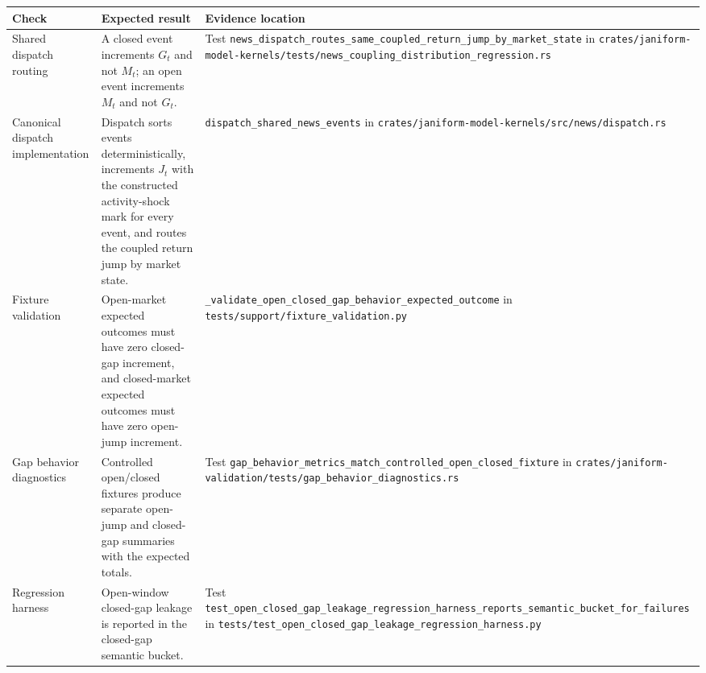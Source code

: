 \documentclass[11pt]{article}
\begin{document}
\begin{tabularx}{\textwidth}{XXX}
\toprule
Check & Expected result & Evidence location\\
\midrule
Shared dispatch routing
& A closed event increments \(G_t\) and not \(M_t\); an open event increments \(M_t\) and not \(G_t\).
& Test \texttt{news\_dispatch\_routes\_same\_coupled\_return\_jump\_by\_market\_state} in \texttt{crates/janiform-model-kernels/tests/news\_coupling\_distribution\_regression.rs}\\
Canonical dispatch implementation
& Dispatch sorts events deterministically, increments \(J_t\) with the constructed activity-shock mark for every event, and routes the coupled return jump by market state.
& \texttt{dispatch\_shared\_news\_events} in \texttt{crates/janiform-model-kernels/src/news/dispatch.rs}\\
Fixture validation
& Open-market expected outcomes must have zero closed-gap increment, and closed-market expected outcomes must have zero open-jump increment.
& \texttt{\_validate\_open\_closed\_gap\_behavior\_expected\_outcome} in \texttt{tests/support/fixture\_validation.py}\\
Gap behavior diagnostics
& Controlled open/closed fixtures produce separate open-jump and closed-gap summaries with the expected totals.
& Test \texttt{gap\_behavior\_metrics\_match\_controlled\_open\_closed\_fixture} in \texttt{crates/janiform-validation/tests/gap\_behavior\_diagnostics.rs}\\
Regression harness
& Open-window closed-gap leakage is reported in the closed-gap semantic bucket.
& Test \texttt{test\_open\_closed\_gap\_leakage\_regression\_harness\_reports\_semantic\_bucket\_for\_failures} in \texttt{tests/test\_open\_closed\_gap\_leakage\_regression\_harness.py}\\
\bottomrule
\end{tabularx}
\end{document}
